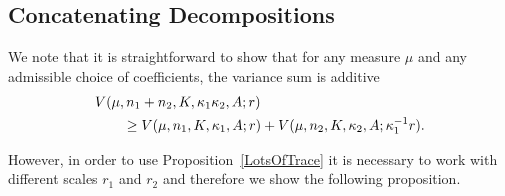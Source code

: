 \documentclass[10pt, english,oneside,reqno]{amsart}
\theoremstyle{plain}
\theoremstyle{remark}
\numberwithin{equation}{section}
\numberwithin{figure}{section}
\DeclareMathOperator{\var}{Var}
\newcommand{\tr}{\mathrm{tr}}
\newcommand{\R}{\mathbb{R}}
\begin{document}



\subsection{Concatenating Decompositions}\label{section:Concatenation}

We note that it is straightforward to show that for any measure $\mu$ and any admissible choice of coefficients, the variance sum is additive
\begin{align}
    \MoveEqLeft V(\mu, n_1 + n_2, K, \kappa_1\kappa_2,A; r) \nonumber \\&\geq V(\mu, n_1, K, \kappa_1,A; r) + V(\mu, n_2, K, \kappa_2,A; \kappa_1^{-1}r). \label{BasicConcat}
\end{align} 

However, in order to use Proposition~\ref{LotsOfTrace} it is necessary to work with different scales $r_1$ and $r_2$ and therefore we show the following proposition.
\end{document}
